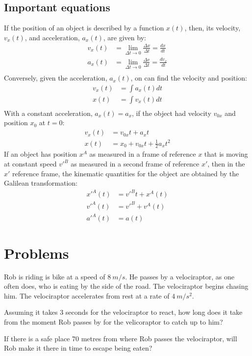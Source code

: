 \subsection{Important equations}
If the position of an object is described by a function $x(t)$, then, its velocity, $v_x(t)$, and acceleration, $a_x(t)$, are given by:
\begin{align*}
v_x(t)&=\lim_{\Delta t\to 0}\frac{\Delta x}{\Delta t}=\frac{dx}{dt}\\
a_x(t)&=\lim_{\Delta t\to 0}\frac{\Delta v}{\Delta t}=\frac{dv_x}{dt}\\
\end{align*}
Conversely, given the acceleration, $a_x(t)$, on can find the velocity and position:
\begin{align*}
v_x(t)&=\int a_x(t)dt\\
x(t)&=\int v_x(t)dt\\
\end{align*}
With a constant acceleration, $a_x(t)=a_x$, if the object had velocity $v_{0x}$ and position $x_0$ at $t=0$:
\begin{align*}
v_x(t)&=v_{0x}t+a_xt\\
x(t)&=x_0+v_{0x}t+\frac{1}{2}a_xt^2
\end{align*}
If an object has position $x^A$ as measured in a frame of reference $x$ that is moving at constant speed $v'^B$ as measured in a second frame of reference $x'$, then in the $x'$ reference frame, the kinematic quantities for the object are obtained by the Galilean transformation:
\begin{align*}
x'^A(t) &= v'^Bt + x^A(t)\\
v'^A(t) &=v'^B+v^A(t)\\
a'^A(t) &= a(t)
\end{align*}

\section{Problems}

\begin{problemParts}{Rob is riding is bike at a speed of $\SI{8}{m/s}$. He passes by a velociraptor, as one often does, who is eating by the side of the road. The velociraptor begins chasing him. The velociraptor accelerates from rest at a rate of $\SI{4}{m/s^2}$.} 
\item Assuming it takes 3 seconds for the velociraptor to react, how long does it take from the moment Rob passes by for the velicoraptor to catch up to him? 
\item If there is a safe place 70 metres from where Rob passes the velociraptor, will Rob make it there in time to escape being eaten?  
\end{problemParts}

